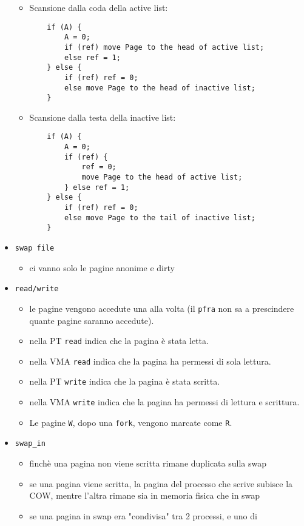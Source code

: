 \documentclass[12pt, a4paper]{report}
\begin{document}
\begin{itemize}
\begin{itemize}
			\item Scansione dalla coda della active list:
				\begin{verbatim}
    if (A) {
        A = 0;
        if (ref) move Page to the head of active list;
        else ref = 1;
    } else {
        if (ref) ref = 0;
        else move Page to the head of inactive list;
    }
				\end{verbatim}
			\item Scansione dalla testa della inactive list:
				\begin{verbatim}
    if (A) {
        A = 0;
        if (ref) {
            ref = 0;
            move Page to the head of active list;
        } else ref = 1;
    } else {
        if (ref) ref = 0;
        else move Page to the tail of inactive list;
    }
				\end{verbatim}
		\end{itemize}
	\item \texttt{swap file}
		\begin{itemize}
			\item ci vanno solo le pagine anonime e dirty
		\end{itemize}
	\item \texttt{read/write}
		\begin{itemize}
			\item le pagine vengono accedute una alla volta (il \texttt{pfra}
				non sa a prescindere quante pagine saranno accedute).
			\item nella PT \texttt{read} indica che la pagina è stata letta.
			\item nella VMA \texttt{read} indica che la pagina ha permessi di
				sola lettura.
			\item nella PT \texttt{write} indica che la pagina è stata scritta.
			\item nella VMA \texttt{write} indica che la pagina ha permessi di
				lettura e scrittura.
			\item  Le pagine \texttt{W}, dopo una \texttt{fork}, vengono marcate
				come \texttt{R}.
		\end{itemize}
	\item \texttt{swap\_in}
		\begin{itemize}
			\item finchè una pagina non viene scritta rimane duplicata sulla
				swap
			\item se una pagina viene scritta, la pagina del processo che scrive
				subisce la COW, mentre l'altra rimane sia in memoria fisica che
				in swap
			\item se una pagina in swap era "condivisa" tra 2 processi, e uno di

\end{itemize}
\end{itemize}
\end{document}
